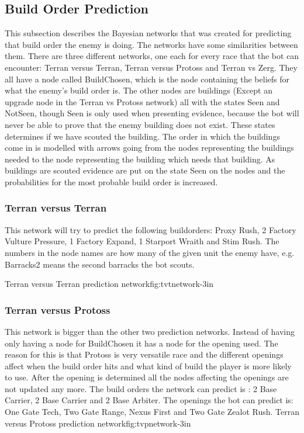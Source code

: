 \subsection{Build Order Prediction}
	This subsection describes the Bayesian networks that was created for predicting that build order the enemy is doing. 
	The networks have some similarities between them. There are three different networks, one each for every race that the bot can encounter: 
	Terran versus Terran, Terran versus Protoss and Terran vs Zerg. 
	They all have a node called BuildChosen, which is the node containing the beliefs for what the enemy's build order is. 
	The other nodes are buildings (Except an upgrade node in the Terran vs Protoss network) all with the states Seen and NotSeen, 
	though Seen is only used when presenting evidence, because the bot will never be able to prove that the enemy building does not exist. 
	These states determines if we have scouted the building. 
	The order in which the buildings come in is modelled with arrows going from the nodes representing the buildings needed to the node 
	representing the building which needs that building. 
	As buildings are scouted evidence are put on the state Seen on the nodes and the probabilities for the most probable build order is increased.

\subsubsection{Terran versus Terran}
	This network will try to predict the following buildorders: Proxy Rush, 2 Factory Vulture Pressure, 1 Factory Expand, 1 Starport Wraith and Stim Rush. 
	The numbers in the node names are how many of the given unit the enemy have, e.g. Barracks2 means the second barracks the bot scouts. 
	
			{Terran versus Terran prediction network}{fig:tvtnetwork}{-3in}	
			
\subsubsection{Terran versus Protoss}
	This network is bigger than the other two prediction networks. Instead of having only having a node for BuildChosen it has a node for the opening 
	used. The reason for this is that Protoss is very versatile race and the different openings affect when the build order hits and what kind of build 
	the player is more likely to use. After the opening is determined all the nodes affecting the openings are not updated any more. The build orders 
	the network can predict is : 2 Base Carrier, 2 Base Carrier and 2 Base Arbiter. The openings the bot can predict is: One Gate Tech, Two Gate Range, 
	Nexus First and Two Gate Zealot Rush.
			{Terran versus Protoss prediction network}{fig:tvpnetwork}{-3in}

